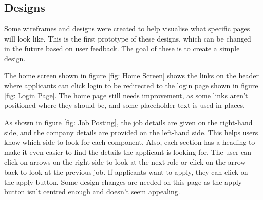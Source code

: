 \subsection{Designs}
Some wireframes and designs were created to help visualise what specific pages will look like. This is the first prototype of these designs, which can be changed in the future based on user feedback. The goal of these is to create a simple design. 

The home screen shown in figure \ref{fig: Home Screen} shows the links on the header where applicants can click login to be redirected to the login page shown in figure \ref{fig: Login Page}. The home page still needs improvement, as some links aren't positioned where they should be, and some placeholder text is used in places. 

As shown in figure \ref{fig: Job Posting}, the job details are given on the right-hand side, and the company details are provided on the left-hand side. This helps users know which side to look for each component. Also, each section has a heading to make it even easier to find the details the applicant is looking for. The user can click on arrows on the right side to look at the next role or click on the arrow back to look at the previous job. If applicants want to apply, they can click on the apply button. Some design changes are needed on this page as the apply button isn't centred enough and doesn't seem appealing.

